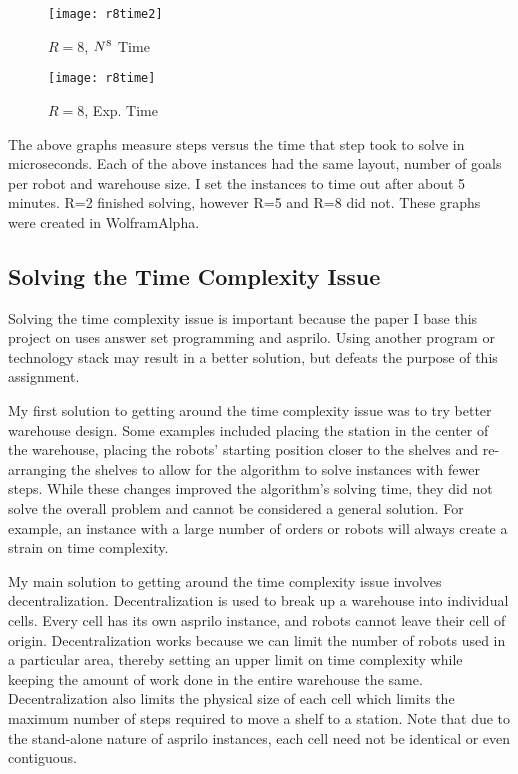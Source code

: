 \documentclass[12pt]{article}
\begin{document}
\begin{figure}[!htb]
  \texttt{[image: r8time2]}
  \caption{$R=8$, $N\textsuperscript{8}$ Time}\label{fig:Figure 4}
\endminipage\hfill
{}
  \texttt{[image: r8time]}
  \caption{$R=8$, Exp. Time}\label{fig:Figure 5}
\endminipage\hfill
\end{figure}


The above graphs measure steps versus the time that step took to solve in microseconds. Each of the above instances had the same layout, number of goals per robot and warehouse size. I set the instances to time out after about 5 minutes. R=2 finished solving, however R=5 and R=8 did not. These graphs were created in WolframAlpha.

\subsection*{Solving the Time Complexity Issue}

Solving the time complexity issue is important because the paper I base this project on uses answer set programming and asprilo. Using another program or technology stack may result in a better solution, but defeats the purpose of this assignment.

My first solution to getting around the time complexity issue was to try better warehouse design. Some examples included placing the station in the center of the warehouse, placing the robots’ starting position closer to the shelves and re-arranging the shelves to allow for the algorithm to solve instances with fewer steps. While these changes improved the algorithm’s solving time, they did not solve the overall problem and cannot be considered a general solution. For example, an instance with a large number of orders or robots will always create a strain on time complexity. 

My main solution to getting around the time complexity issue involves decentralization. Decentralization is used to break up a warehouse into individual cells. Every cell has its own asprilo instance, and robots cannot leave their cell of origin. Decentralization works because we can limit the number of robots used in a particular area, thereby setting an upper limit on time complexity while keeping the amount of work done in the entire warehouse the same. Decentralization also limits the physical size of each cell which limits the maximum number of steps required to move a shelf to a station. Note that due to the stand-alone nature of asprilo instances, each cell need not be identical or even contiguous.
\end{document}
